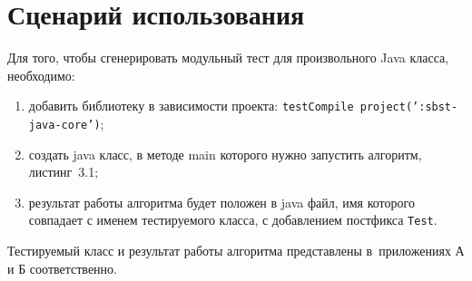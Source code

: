 \section{Сценарий использования}

Для того, чтобы сгенерировать модульный тест для произвольного Java класса, необходимо:

\begin{enumerate}
	\item добавить библиотеку в зависимости проекта: \texttt{testCompile project(':sbst-java-core')};
	\item создать java класс, в методе main которого нужно запустить алгоритм, листинг~3.1;
	\item результат работы алгоритма будет положен в java файл, имя которого совпадает с именем тестируемого класса, с добавлением постфикса \texttt{Test}. 
\end{enumerate}

Тестируемый класс и результат работы алгоритма представлены в~приложениях А и Б соответственно.
